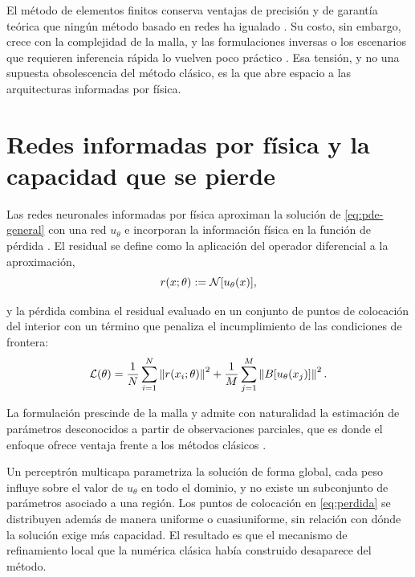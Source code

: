 
El método de elementos finitos conserva ventajas de precisión y de garantía teórica que ningún método basado en redes ha igualado \cite{lu2021deepxde}. Su costo, sin embargo, crece con la complejidad de la malla, y las formulaciones inversas o los escenarios que requieren inferencia rápida lo vuelven poco práctico \cite{karniadakis2021}. Esa tensión, y no una supuesta obsolescencia del método clásico, es la que abre espacio a las arquitecturas informadas por física.

\section{Redes informadas por física y la capacidad que se pierde}

Las redes neuronales informadas por física aproximan la solución de \eqref{eq:pde-general} con una red $u_\theta$ e incorporan la información física en la función de pérdida \cite{raissi2019}. El residual se define como la aplicación del operador diferencial a la aproximación,
\begin{equation}
  r(x;\theta) := \mathcal{N}[u_\theta(x)],
\label{eq:residual}
\end{equation}

y la pérdida combina el residual evaluado en un conjunto de puntos de colocación del interior con un término que penaliza el incumplimiento de las condiciones de frontera:
\begin{equation}
  \mathcal{L}(\theta)
  = \frac{1}{N}\sum_{i=1}^{N} \left\| r(x_i;\theta) \right\|^2
  + \frac{1}{M}\sum_{j=1}^{M} \left\| B[u_\theta(x_j)] \right\|^2 .
\label{eq:perdida}
\end{equation}


La formulación prescinde de la malla y admite con naturalidad la estimación de parámetros desconocidos a partir de observaciones parciales, que es donde el enfoque ofrece ventaja frente a los métodos clásicos \cite{raissi2019}.

Un perceptrón multicapa parametriza la solución de forma global,  cada peso influye sobre el valor de $u_\theta$ en todo el dominio, y no existe un subconjunto de parámetros asociado a una región. Los puntos de colocación en \eqref{eq:perdida} se distribuyen además de manera uniforme o cuasiuniforme, sin relación con dónde la solución exige más capacidad. El resultado es que el mecanismo de refinamiento local que la numérica clásica había construido desaparece del método.

